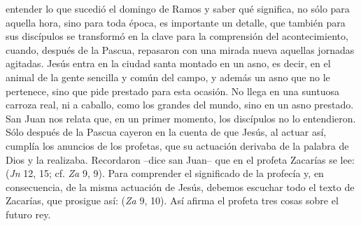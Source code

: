 \begin{body}
 entender lo que sucedió el domingo de Ramos y saber qué significa, no sólo para aquella hora, sino para toda época, es importante un detalle, que también para sus discípulos se transformó en la clave para la comprensión del acontecimiento, cuando, después de la Pascua, repasaron con una mirada nueva aquellas jornadas agitadas. Jesús entra en la ciudad santa montado en un asno, es decir, en el animal de la gente sencilla y común del campo, y además un asno que no le pertenece, sino que pide prestado para esta ocasión. No llega en una suntuosa carroza real, ni a caballo, como los grandes del mundo, sino en un asno prestado. San Juan nos relata que, en un primer momento, los discípulos no lo entendieron. Sólo después de la Pascua cayeron en la cuenta de que Jesús, al actuar así, cumplía los anuncios de los profetas, que su actuación derivaba de la palabra de Dios y la realizaba. Recordaron –dice san Juan– que en el profeta Zacarías se lee:  (\textit{Jn} 12, 15; cf. \textit{Za} 9, 9). Para comprender el significado de la profecía y, en consecuencia, de la misma actuación de Jesús, debemos escuchar todo el texto de Zacarías, que prosigue así:  (\textit{Za} 9, 10). Así afirma el profeta tres cosas sobre el futuro rey.


\end{body}
